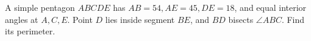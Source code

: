 A simple pentagon $ABCDE$ has $AB=54,AE=45,DE=18$, and equal interior angles at $A,C,E$. Point $D$ lies inside segment $BE$, and $BD$ bisects $\angle ABC$. Find its perimeter.
